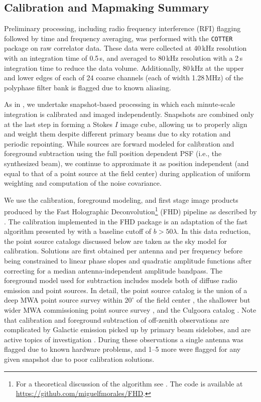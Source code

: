
\subsection{Calibration and Mapmaking Summary} \label{sec:processing}

Preliminary processing, including radio frequency interference (RFI) flagging followed by time and frequency averaging, was performed with the \texttt{COTTER} package \cite{AndreMWARFI} on raw correlator data. These data were collected at 40\,kHz resolution with an integration time of 0.5\,s, and averaged to 80\,kHz resolution with a 2\,s integration time to reduce the data volume. Additionally, 80\,kHz at the upper and lower edges of each of 24 coarse channels (each of width 1.28\,MHz) of the polyphase filter bank is flagged due to known aliasing.

As in \cite{X13}, we undertake snapshot-based processing in which each minute-scale integration is calibrated and imaged independently. Snapshots are combined only at the last step in forming a Stokes $I$ image cube, allowing us to properly align and weight them despite different primary beams due to sky rotation and periodic repointing. 
While sources are forward modeled for calibration and foreground subtraction using the full position dependent PSF (i.e., the synthesized beam), we continue to approximate it as position independent (and equal to that of a point source at the field center) during application of uniform weighting and computation of the noise covariance. 

We use the calibration, foreground modeling, and first stage image products produced by the Fast Holographic Deconvolution\footnote{For a theoretical discussion of the algorithm see \cite{fhd}. The code is available at \url{https://github.com/miguelfmorales/FHD}.} (FHD) pipeline as described by \cite{JacobsPipelines}. The calibration implemented in the FHD package is an adaptation of the fast algorithm presented by \cite{Salvini2014} with a baseline cutoff of $b>50\lambda$. In this data reduction, the point source catalogs discussed below are taken as the sky model for calibration.  Solutions are first obtained per antenna and per frequency before being constrained to linear phase slopes and quadratic amplitude functions after correcting for a median antenna-independent amplitude bandpass.  The foreground model used for subtraction includes models both of diffuse radio emission \cite{AdamDiffuse} and point sources. In detail, the point source catalog is the union of a deep MWA point source survey within $20^\circ$ of the field center \cite{PattiCatalog1}, the shallower but wider MWA commissioning point source survey \cite{MWACS}, and the Culgoora catalog \cite{Slee1995}. Note that calibration and foreground subtraction of off-zenith observations are complicated by Galactic emission picked up by primary beam sidelobes, and are active topics of investigation \cite{pober16,nithya15,nithya15b}. During these observations a single antenna was flagged due to known hardware problems, and 1--5 more were flagged for any given snapshot due to poor calibration solutions.

